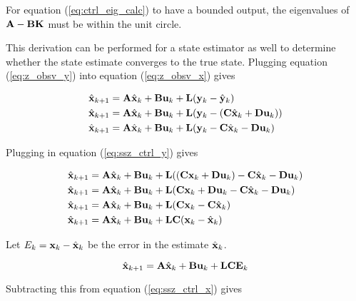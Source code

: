 For equation (\ref{eq:ctrl_eig_calc}) to have a bounded output, the eigenvalues
of $\mathbf{A} - \mathbf{B}\mathbf{K}$ must be within the unit circle.

This derivation can be performed for a \gls{state} estimator as well to
determine whether the \gls{state} estimate converges to the true \gls{state}.
Plugging equation (\ref{eq:z_obsv_y}) into equation (\ref{eq:z_obsv_x}) gives

\begin{align*}
  \hat{\mathbf{x}}_{k+1} &= \mathbf{A}\hat{\mathbf{x}}_k + \mathbf{B}\mathbf{u}_k +
    \mathbf{L} (\mathbf{y}_k - \hat{\mathbf{y}}_k) \\
  \hat{\mathbf{x}}_{k+1} &= \mathbf{A}\hat{\mathbf{x}}_k + \mathbf{B}\mathbf{u}_k +
    \mathbf{L} (\mathbf{y}_k - (\mathbf{C}\hat{\mathbf{x}}_k + \mathbf{D}\mathbf{u}_k)) \\
  \hat{\mathbf{x}}_{k+1} &= \mathbf{A}\hat{\mathbf{x}}_k + \mathbf{B}\mathbf{u}_k +
    \mathbf{L} (\mathbf{y}_k - \mathbf{C}\hat{\mathbf{x}}_k - \mathbf{D}\mathbf{u}_k)
\end{align*}

Plugging in equation (\ref{eq:ssz_ctrl_y}) gives

\begin{align*}
  \hat{\mathbf{x}}_{k+1} &= \mathbf{A}\hat{\mathbf{x}}_k + \mathbf{B}\mathbf{u}_k +
    \mathbf{L}((\mathbf{C}\mathbf{x}_k + \mathbf{D}\mathbf{u}_k) - \mathbf{C}\hat{\mathbf{x}}_k -
    \mathbf{D}\mathbf{u}_k) \\
  \hat{\mathbf{x}}_{k+1} &= \mathbf{A}\hat{\mathbf{x}}_k + \mathbf{B}\mathbf{u}_k +
    \mathbf{L}(\mathbf{C}\mathbf{x}_k + \mathbf{D}\mathbf{u}_k - \mathbf{C}\hat{\mathbf{x}}_k -
    \mathbf{D}\mathbf{u}_k) \\
  \hat{\mathbf{x}}_{k+1} &= \mathbf{A}\hat{\mathbf{x}}_k + \mathbf{B}\mathbf{u}_k +
    \mathbf{L}(\mathbf{C}\mathbf{x}_k - \mathbf{C}\hat{\mathbf{x}}_k) \\
  \hat{\mathbf{x}}_{k+1} &= \mathbf{A}\hat{\mathbf{x}}_k + \mathbf{B}\mathbf{u}_k +
    \mathbf{L}\mathbf{C}(\mathbf{x}_k - \hat{\mathbf{x}}_k)
\end{align*}

Let $E_k = \mathbf{x}_k - \hat{\mathbf{x}}_k$ be the error in the estimate
$\hat{\mathbf{x}}_k$.

\begin{equation*}
  \hat{\mathbf{x}}_{k+1} = \mathbf{A}\hat{\mathbf{x}}_k + \mathbf{B}\mathbf{u}_k +
    \mathbf{L}\mathbf{C}\mathbf{E}_k
\end{equation*}

Subtracting this from equation (\ref{eq:ssz_ctrl_x}) gives

